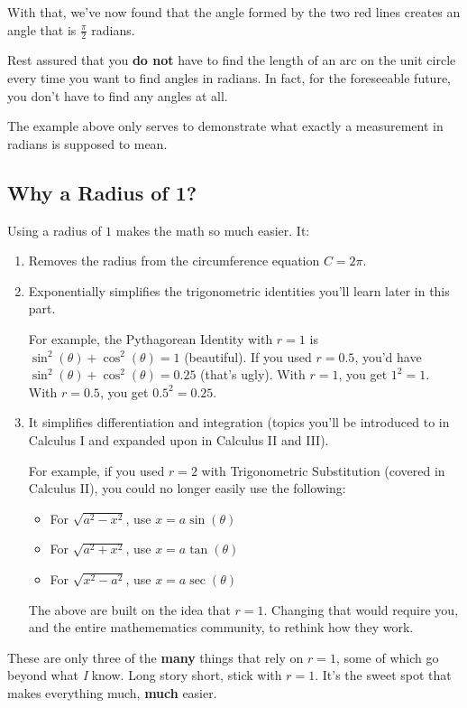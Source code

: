 With that, we've now found that the angle formed by the two red lines creates an angle that is $\frac{\pi}{2}$ radians.

Rest assured that you \textbf{do not} have to find the length of an arc on the unit circle every time you want to find angles in radians. In fact, for the foreseeable future, you don't have to find any angles at all.

The example above only serves to demonstrate what exactly a measurement in radians is supposed to mean.
\clearpage
\subsection{Why a Radius of 1?}
Using a radius of $1$ makes the math so much easier. It:
\begin{enumerate}
    \item Removes the radius from the circumference equation $C = 2\pi$.
    \item Exponentially simplifies the trigonometric identities you'll learn later in this part.
    
    For example, the Pythagorean Identity with $r = 1$ is $\sin^2(\theta) + \cos^2(\theta) = 1$ (beautiful). If you used $r = 0.5$, you'd have $\sin^2(\theta) + \cos^2(\theta) = 0.25$ (that's ugly). With $r = 1$, you get $1^2 = 1$. With $r = 0.5$, you get $0.5^2 = 0.25$.
    \item It simplifies differentiation and integration (topics you'll be introduced to in Calculus I and expanded upon in Calculus II and III).
    
    For example, if you used $r = 2$ with Trigonometric Substitution (covered in Calculus II), you could no longer easily use the following:
    \begin{itemize}
        \item For $\sqrt{a^2 - x^2}$, use $x = a\sin(\theta)$
        \item For $\sqrt{a^2 + x^2}$, use $x = a\tan(\theta)$
        \item For $\sqrt{x^2 - a^2}$, use $x = a\sec(\theta)$
    \end{itemize}
    The above are built on the idea that $r = 1$. Changing that would require you, and the entire mathemematics community, to rethink how they work.
\end{enumerate}
These are only three of the \textbf{many} things that rely on $r = 1$, some of which go beyond what \textit{I} know. Long story short, stick with $r = 1$. It's the sweet spot that makes everything much, \textbf{much} easier.